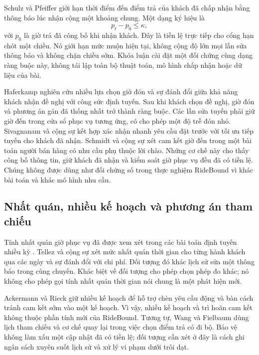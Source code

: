 Schulz và Pfeiffer \cite{schulz2026} giới hạn thời điểm đến điểm trả của khách đã
chấp nhận bằng thông báo lúc nhận cộng một khoảng chung. Một dạng ký hiệu là
\begin{equation}
p_t-p_0\leq\kappa,
\end{equation}
với $p_0$ là giờ trả đã công bố khi nhận khách. Đây là tiền lệ trực tiếp cho cổng
hạn chót một chiều. Nó giới hạn mức muộn hiện tại, không cộng độ lớn mọi lần sửa
thông báo và không chặn chiều sớm. Khóa luận cài đặt một đối chứng cùng dạng ràng
buộc này, không tái lập toàn bộ thuật toán, mô hình chấp nhận hoặc dữ liệu của bài.

Haferkamp \cite{haferkamp2024} nghiên cứu nhiều lựa chọn giờ đón và sự đánh đổi giữa
khả năng khách nhận đề nghị với công sức định tuyến. Sau khi khách chọn đề nghị, giờ đón
và phương án gán đã thống nhất trở thành ràng buộc. Các lần sửa tuyến phải giữ giờ đến
trong cửa sổ phục vụ tương ứng, có cho phép một độ trễ đón nhỏ.
Sivagnanam và cộng sự
\cite{sivagnanam2026} kết hợp xác nhận nhanh yêu cầu đặt trước với tối ưu tiếp tuyến
cho khách đã nhận. Schmidt và cộng sự \cite{schmidt2026} xét cam kết giờ đến trong
một bài toán người bán hàng có nhu cầu phụ thuộc lời chào. Những cơ chế này cho thấy
công bố thông tin, giữ khách đã nhận và kiểm soát giờ phục vụ đều đã có tiền lệ.
Chúng không được dùng như đối chứng số trong thực nghiệm RideBound vì khác bài toán
và khác mô hình nhu cầu.

\subsection{Nhất quán, nhiều kế hoạch và phương án tham chiếu}

Tính nhất quán giờ phục vụ đã được xem xét trong các bài toán định tuyến nhiều kỳ
\cite{kovacs2014}. Tellez và cộng sự \cite{tellez2022} xét mức nhất quán thời gian
cho từng hành khách qua các ngày và sự đánh đổi với chi phí. Đối tượng đó khác lịch
sử sửa một thông báo trong cùng chuyến. Khác biệt về đối tượng cho phép chọn phép
đo khác; nó không cho phép gọi tính nhất quán thời gian nói chung là một phát hiện mới.

Ackermann và Rieck \cite{ackermann2025} giữ nhiều kế hoạch để hỗ trợ chèn yêu cầu động
và bàn cách tránh cam kết sớm vào một kế hoạch. Vì vậy, nhiều kế hoạch và trì hoãn cam
kết không thuộc phần tính mới của RideBound. Tương tự, Wang và Fielbaum
\cite{wang2026walking} dùng lịch tham chiếu và cơ chế quay lại trong việc chọn điểm
trả có đi bộ. Bảo vệ không làm xấu một cập nhật đã có tiền lệ; đối tượng cần xét ở
đây là cách ghi ngân sách xuyên suốt lịch sử và xử lý vi phạm dưới trôi dạt.

